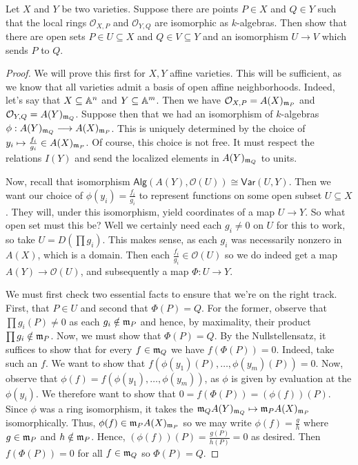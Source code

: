 \label{1.4.7}

Let $X$ and $Y$ be two varieties. Suppose there are points $P \in X$ and $Q \in Y$ such that the local rings $\mathcal O_{X, P}$ and $\mathcal O_{Y, Q}$ are isomorphic as $k$-algebras. Then show that there are open sets $P \in U \subseteq X$ and $Q \in V \subseteq Y$ and an isomorphism $U \longrightarrow V$ which sends $P$ to $Q$.

\begin{proof}
    We will prove this first for $X, Y$ affine varieties. This will be sufficient, as we know that all varieties admit a basis of open affine neighborhoods. Indeed, let's say that $X \subseteq \mathbb A^n$ and $Y \subseteq \mathbb A^m$. Then we have $\mathcal O_{X, P} = A(X)_{\mathfrak m_P}$ and $\mathcal O_{Y, Q} = A(Y)_{\mathfrak m_Q}$. Suppose then that we had an isomorphism of $k$-algebras $\phi: A(Y)_{\mathfrak m_Q} \longrightarrow A(X)_{\mathfrak m_P}$. This is uniquely determined by the choice of $y_i \mapsto \frac{f_i}{g_i} \in A(X)_{\mathfrak m_P}$. Of course, this choice is not free. It must respect the relations $I(Y)$ and send the localized elements in $A(Y)_{\mathfrak m_Q}$ to units.

    Now, recall that isomorphism $\mathsf{Alg}(A(Y), \mathcal O(U)) \cong \mathsf{Var}(U, Y)$. Then we want our choice of $\phi(y_i) = \frac{f_i}{g_i}$ to represent functions on some open subset $U \subseteq X$. They will, under this isomorphism, yield coordinates of a map $U \longrightarrow Y$. So what open set must this be? Well we certainly need each $g_i \neq 0$ on $U$ for this to work, so take $U = D(\prod g_i)$. This makes sense, as each $g_i$ was necessarily nonzero in $A(X)$, which is a domain. Then each $\frac{f_i}{g_i} \in \mathcal O(U)$ so we do indeed get a map $A(Y) \longrightarrow \mathcal O(U)$, and subsequently a map $\Phi: U \longrightarrow Y$.

    We must first check two essential facts to ensure that we're on the right track. First, that $P \in U$ and second that $\Phi(P) = Q$. For the former, observe that $\prod g_i(P) \neq 0$ as each $g_i \notin \mathfrak m_P$ and hence, by maximality, their product $\prod g_i \notin \mathfrak m_P$. Now, we must show that $\Phi(P) = Q$. By the Nullstellensatz, it suffices to show that for every $f \in \mathfrak m_Q$ we have $f(\Phi(P)) = 0$. Indeed, take such an $f$. We want to show that $f(\phi(y_1)(P), \dots, \phi(y_m)(P)) = 0$. Now, observe that $\phi(f) = f(\phi(y_1), \dots, \phi(y_m))$, as $\phi$ is given by evaluation at the $\phi(y_i)$. We therefore want to show that $0 = f(\Phi(P)) = (\phi(f))(P)$. Since $\phi$ was a ring isomorphism, it takes the $\mathfrak m_Q A(Y)_{\mathfrak m_Q} \mapsto \mathfrak m_P A(X)_{\mathfrak m_P}$ isomorphically. Thus, $\phi(f) \in \mathfrak m_P A(X)_{\mathfrak m_P}$ so we may write $\phi(f) = \frac{g}{h}$ where $g \in \mathfrak m_P$ and $h \notin \mathfrak m_P$. Hence, $(\phi(f))(P) = \frac{g(P)}{h(P)} = 0$ as desired. Then $f(\Phi(P)) = 0$ for all $f \in \mathfrak m_Q$ so $\Phi(P) = Q$.


\end{proof}
